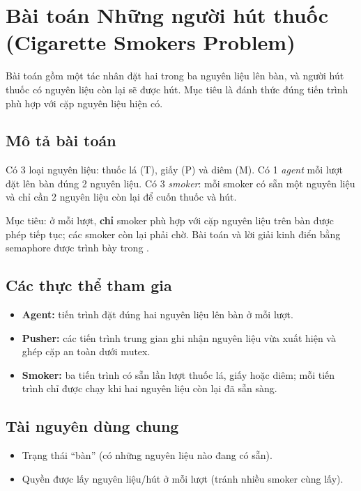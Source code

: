 \section{Bài toán Những người hút thuốc (Cigarette Smokers Problem)}

Bài toán gồm một tác nhân đặt hai trong ba nguyên liệu lên bàn, và người hút thuốc có nguyên liệu còn lại sẽ được hút. Mục tiêu là đánh thức đúng tiến trình phù hợp với cặp nguyên liệu hiện có.

\subsection{Mô tả bài toán}
Có 3 loại nguyên liệu: thuốc lá (T), giấy (P) và diêm (M). Có 1 \textit{agent} mỗi lượt đặt lên bàn đúng 2 nguyên liệu. Có 3 \textit{smoker}: mỗi smoker có sẵn một nguyên liệu và chỉ cần 2 nguyên liệu còn lại để cuốn thuốc và hút.

Mục tiêu: ở mỗi lượt, \textbf{chỉ} smoker phù hợp với cặp nguyên liệu trên bàn được phép tiếp tục; các smoker còn lại phải chờ. Bài toán và lời giải kinh điển bằng semaphore được trình bày trong \cite{downey2016}.

\subsection{Các thực thể tham gia}
\begin{itemize}
    \item \textbf{Agent:} tiến trình đặt đúng hai nguyên liệu lên bàn ở mỗi lượt.
    \item \textbf{Pusher:} các tiến trình trung gian ghi nhận nguyên liệu vừa xuất hiện và ghép cặp an toàn dưới mutex.
    \item \textbf{Smoker:} ba tiến trình có sẵn lần lượt thuốc lá, giấy hoặc diêm; mỗi tiến trình chỉ được chạy khi hai nguyên liệu còn lại đã sẵn sàng.
\end{itemize}

\subsection{Tài nguyên dùng chung}
\begin{itemize}
    \item Trạng thái “bàn” (có những nguyên liệu nào đang có sẵn).
    \item Quyền được lấy nguyên liệu/hút ở mỗi lượt (tránh nhiều smoker cùng lấy).
\end{itemize}

